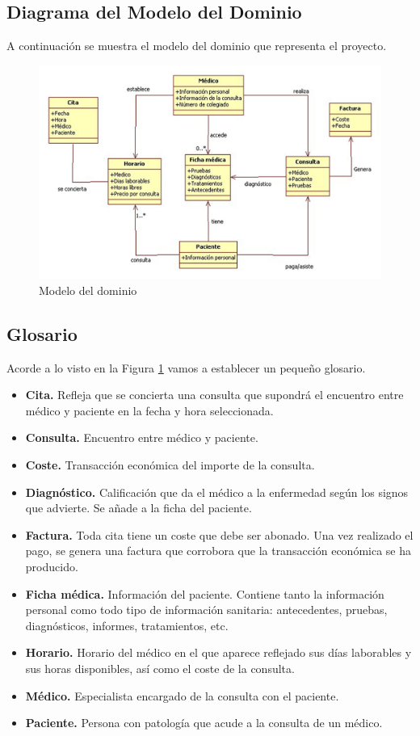 	\subsection{Diagrama del Modelo del Dominio}

	A continuación se muestra el modelo del dominio que representa el proyecto.
	\begin{figure}[H]
	  \centering
	    \includegraphics{img/modelo.jpg}
	  \caption{Modelo del dominio}
	  \label{modelodominio}
	\end{figure}

	\subsection{Glosario}
	Acorde a lo visto en la Figura \ref{modelodominio} vamos a establecer un pequeño glosario.

	\begin{itemize}
		\item \textbf{Cita.} Refleja que se concierta una consulta que supondrá el encuentro entre médico y paciente en la fecha y hora seleccionada. 
		\item \textbf{Consulta.} Encuentro entre médico y paciente.
		\item \textbf{Coste.} Transacción económica del importe de la consulta. 
		\item \textbf{Diagnóstico.} Calificación que da el médico a la enfermedad según los signos que advierte. Se añade a la ficha del paciente.
		\item \textbf{Factura.} Toda cita tiene un coste que debe ser abonado. Una vez realizado el pago, se genera una factura que corrobora que la transacción económica se ha producido.	
		\item \textbf{Ficha médica.} Información del paciente. Contiene tanto la información personal como todo tipo de información sanitaria: antecedentes, pruebas, diagnósticos, informes, tratamientos, etc.
		\item \textbf{Horario.} Horario del médico en el que aparece reflejado sus días laborables y sus horas disponibles, así como el coste de la consulta.
		\item \textbf{Médico.} Especialista encargado de la consulta con el paciente.
		\item \textbf{Paciente.} Persona con patología que acude a la consulta de un médico.
	\end{itemize}
